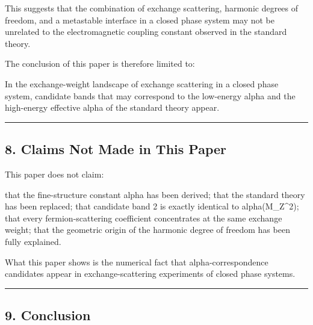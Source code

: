 \documentclass[
]{article}
\newenvironment{Shaded}{}{}
\newcommand{\NormalTok}[1]{#1}
\begin{document}
This suggests that the combination of exchange scattering, harmonic
degrees of freedom, and a metastable interface in a closed phase system
may not be unrelated to the electromagnetic coupling constant observed
in the standard theory.

The conclusion of this paper is therefore limited to:

\begin{Shaded}
\begin{Highlighting}[]
\NormalTok{In the exchange{-}weight landscape of exchange scattering in a closed phase system,}
\NormalTok{candidate bands that may correspond to the low{-}energy alpha}
\NormalTok{and the high{-}energy effective alpha of the standard theory appear.}
\end{Highlighting}
\end{Shaded}

\begin{center}\rule{0.5\linewidth}{0.5pt}\end{center}

\subsection{8. Claims Not Made in This
Paper}\label{claims-not-made-in-this-paper}

This paper does not claim:

\begin{Shaded}
\begin{Highlighting}[]
\NormalTok{that the fine{-}structure constant alpha has been derived;}
\NormalTok{that the standard theory has been replaced;}
\NormalTok{that candidate band 2 is exactly identical to alpha(M\_Z\^{}2);}
\NormalTok{that every fermion{-}scattering coefficient concentrates at the same exchange weight;}
\NormalTok{that the geometric origin of the harmonic degree of freedom has been fully explained.}
\end{Highlighting}
\end{Shaded}

What this paper shows is the numerical fact that alpha-correspondence
candidates appear in exchange-scattering experiments of closed phase
systems.

\begin{center}\rule{0.5\linewidth}{0.5pt}\end{center}

\subsection{9. Conclusion}\label{conclusion}
\end{document}

